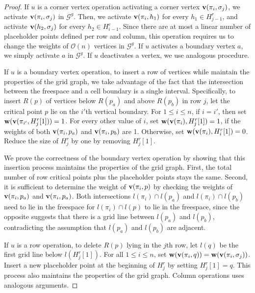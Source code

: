 \documentclass[thm-restate]{lipics-v2021}
\theoremstyle{remark}
\newcommand{\Oh}{\mathcal{O}}
\newcommand{\weight}[1]{\normalfont \textbf{w}(#1)}
\newcommand{\graph}[0]{\mathcal{G}}
\newcommand{\vertex}[1]{\normalfont \textbf{v}(#1)}
\newcommand{\ggraph}[0]{\graph^g}
\newcommand{\row}[1]{R(#1)}
\begin{document}
\begin{proof}
    If $u$ is a corner vertex operation activating a corner vertex $\vertex{\pi_i, \sigma_j}$, we activate $\vertex{\pi_i, \sigma_j}$ in $\ggraph$. Then, we activate $\vertex{\pi_i, h_1}$ for every $h_1 \in H^r_{j - 1}$, and activate $\vertex{h_2, \sigma_j}$ for every $h_2 \in H^c_{i - 1}$. Since there are at most a linear number of placeholder points defined per row and column, this operation requires us to change the weights of $\Oh(n)$ vertices in $\ggraph$. If $u$ activates a boundary vertex $a$, we simply activate $a$ in $\ggraph$. If $u$ deactivates a vertex, we use analogous procedure. 
    
    If $u$ is a boundary vertex operation, to insert a row of vertices while maintain the properties of the grid graph, we take advantage of the fact that the intersection between the freespace and a cell boundary is a single interval. Specifically, to insert $\row{p}$ of vertices below $\row{p_a}$ and above $\row{p_b}$ in row $j$, let the critical point $p$ lie on the $i'$th vertical boundary. For $1 \leq i \leq n$, if $i = i'$, then set $\weight{\vertex{\pi_{i'}, H^r_j[1]}} = 1$. For every other value of $i$, set $\weight{\vertex{\pi_i}, H^r_j[1]} = 1$, if the weights of both $\vertex{\pi_i, p_a}$ and $\vertex{\pi_i, p_b}$ are 1. Otherwise, set $\weight{\vertex{\pi_i}, H^r_i[1]} = 0$. Reduce the size of $H^r_j$ by one by removing $H^r_j[1]$. 
    
    We prove the correctness of the boundary vertex operation by showing that this insertion process maintains the properties of the grid graph. First, the total number of row critical points plus the placeholder points stays the same. Second, it is sufficient to determine the weight of $\vertex{\pi_i, p}$ by checking the weights of $\vertex{\pi_i, p_a}$ and $\vertex{\pi_i, p_a}$. Both intersections $l(\pi_i) \cap l(p_a)$ and $l(\pi_i) \cap l(p_b)$ need to lie in the freespace for $l(\pi_i) \cap l(p)$ to lie in the freespace, since the opposite suggests that there is a grid line between $l(p_a)$ and $l(p_b)$, contradicting the assumption that $l(p_a)$ and $l(p_b)$ are adjacent.
    
    If $u$ is a row operation, to delete $\row{p}$ lying in the $j$th row, let $l(q)$ be the first grid line below $l(H^r_j[1])$. For all $1 \leq i \leq n$, set $\weight{\vertex{\pi_i, q}} = \weight{\vertex{\pi_i, \sigma_j}}$. Insert a new placeholder point at the beginning of $H^r_j$ by setting $H^r_j[1] = q$. This process also maintains the properties of the grid graph. Column operations uses analogous arguments. 
\end{proof}
\end{document}
